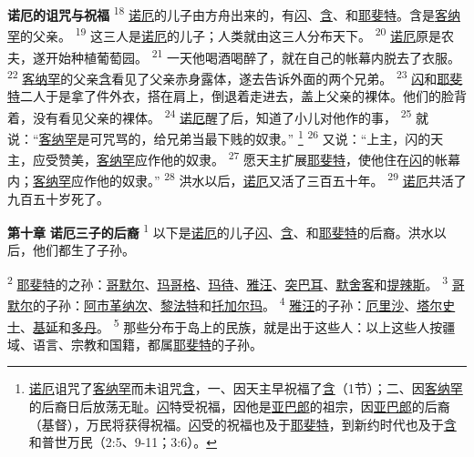 \textbf{诺厄的诅咒与祝福 }
\textsuperscript{18}
\uline{诺厄}的儿子由方舟出来的，有\uline{闪}、\uline{含}、和\uline{耶斐特}。含是\uline{客纳罕}的父亲。
\textsuperscript{19}
这三人是\uline{诺厄}的儿子；人类就由这三人分布天下。
\textsuperscript{20}
\uline{诺厄}原是农夫，遂开始种植葡萄园。
\textsuperscript{21}
一天他喝酒喝醉了，就在自己的帐幕内脱去了衣服。
\textsuperscript{22}
\uline{客纳罕}的父亲\uline{含}看见了父亲赤身露体，遂去告诉外面的两个兄弟。
\textsuperscript{23}
\uline{闪}和\uline{耶斐特}二人于是拿了件外衣，搭在肩上，倒退着走进去，盖上父亲的裸体。他们的脸背着，没有看见父亲的裸体。
\textsuperscript{24}
\uline{诺厄}醒了后，知道了小儿对他作的事，
\textsuperscript{25}
就说：“\uline{客纳罕}是可咒骂的，给兄弟当最下贱的奴隶。”
\footnote{\uline{诺厄}诅咒了\uline{客纳罕}而未诅咒\uline{含}，一、因天主早祝福了\uline{含}（1节）；二、因\uline{客纳罕}的后裔日后放荡无耻。\uline{闪}特受祝福，因他是\uline{亚巴郎}的祖宗，因\uline{亚巴郎}的后裔（基督），万民将获得祝福。\uline{闪}受的祝福也及于\uline{耶斐特}，到新约时代也及于\uline{含}和普世万民（2:5、9-11；3:6）。}
\textsuperscript{26}
又说：“上主，闪的天主，应受赞美，\uline{客纳罕}应作他的奴隶。
\textsuperscript{27}
愿天主扩展\uline{耶斐特}，使他住在\uline{闪}的帐幕内；\uline{客纳罕}应作他的奴隶。”
\textsuperscript{28}
洪水以后，\uline{诺厄}又活了三百五十年。
\textsuperscript{29}
\uline{诺厄}共活了九百五十岁死了。

\textbf{第十章 }
\textbf{诺厄三子的后裔 }
\textsuperscript{1}
以下是\uline{诺厄}的儿子\uline{闪}、\uline{含}、和\uline{耶斐特}的后裔。洪水以后，他们都生了子孙。

\textsuperscript{2}
\uline{耶斐特}的之孙：\uline{哥默尔}、\uline{玛哥格}、\uline{玛待}、\uline{雅汪}、\uline{突巴耳}、\uline{默舍客}和\uline{提辣斯}。
\textsuperscript{3}
\uline{哥默尔}的子孙：\uline{阿市}\uline{革纳次}、\uline{黎法特}和\uline{托加尔玛}。
\textsuperscript{4}
\uline{雅汪}的子孙：\uline{厄里沙}、\uline{塔尔史士}、\uline{基延}和\uline{多丹}。
\textsuperscript{5}
那些分布于岛上的民族，就是出于这些人：以上这些人按疆域、语言、宗教和国籍，都属\uline{耶斐特}的子孙。

